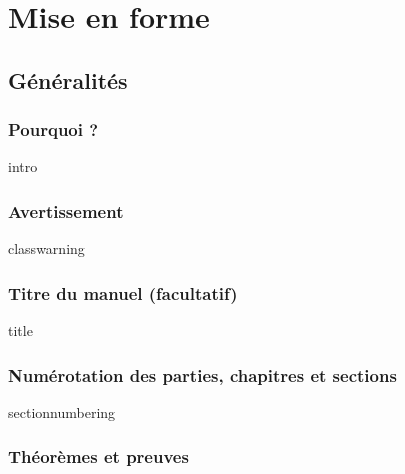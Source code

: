 \documentclass[14pt]{memoir}
\begin{document}



\part{Mise en forme}

\chapter{Généralités}

\section{Pourquoi ?}

{intro}




\section{Avertissement}

{classwarning}




\section{Titre du manuel (facultatif)}

{title}




\section{Numérotation des parties, chapitres et sections}

{sectionnumbering}




\section{Théorèmes et preuves}
\end{document}
